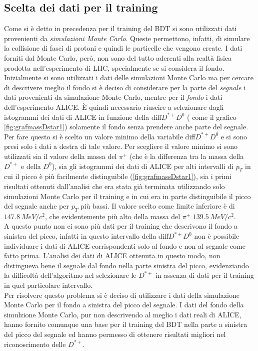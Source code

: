 \subsection{Scelta dei dati per il training}
Come si è detto in precedenza per il training del BDT si sono utilizzati dati provenienti da \textit{simulazioni Monte Carlo}. Queste permettono, infatti, di simulare la collisione di fasci di protoni e quindi le particelle che vengono create. I dati forniti dal Monte Carlo, però, non sono del tutto aderenti alla realtà fisica prodotta nell'esperimento di LHC, specialmente se si considera il fondo. 
\\ Inizialmente si sono utilizzati i dati delle simulazioni Monte Carlo ma per cercare di descrivere meglio il fondo si è deciso di considerare per la parte del \textit{segnale} i dati provenienti da simulazione Monte Carlo, mentre per il \textit{fondo} i dati dell'esperimento ALICE. È quindi necessario riuscire a selezionare dagli istogrammi dei dati di ALICE in funzione della diff${D^{*+}D^0}$ ( come il grafico \ref{fig:grafmassDstar1}) solamente il fondo senza prendere anche parte del segnale. Per fare questo si è scelto un valore minimo della variabile diff${D^{*+}D^0}$ e si sono presi solo i dati a destra di tale valore. Per scegliere il valore minimo si sono utilizzati sia il valore della massa del $\pi^+$ (che è la differenza tra la massa della $D^{*+}$ e della $D^0$), sia gli istogrammi dei dati di ALICE per alti intervalli di $p_T$ in cui il picco è più facilmente distinguibile (\ref{fig:grafmassDstar1}), sia i primi risultati ottenuti dall'analisi che era stata già terminata utilizzando solo simulazioni Monte Carlo per il training e in cui era in parte distinguibile il picco del segnale anche per $p_T$ più bassi. Il valore scelto come limite inferiore è di $147.8 \ MeV/c^2$, che evidentemente più alto della massa del $\pi^+$ $139.5 \ MeV/c^2$.
\\A questo punto non ci sono più dati per il training che descrivono il fondo a sinistra del picco, infatti in questo intervallo della diff${D^{*+}D^0}$ non è possibile individuare i dati di ALICE corrispondenti solo al fondo e non al segnale come fatto prima. L'analisi dei dati di ALICE  ottenuta in questo modo, non distingueva bene il segnale dal fondo nella parte sinistra del picco, evidenziando la difficoltà dell'algoritmo nel selezionare le $D^{*+}$ in assenza di dati per il training in quel particolare intervallo. 
\\Per risolvere questo problema si è deciso di utilizzare i dati della simulazione Monte Carlo per il fondo a sinistra del picco del segnale. I dati del fondo della simulzione Monte Carlo, pur non descrivendo al meglio i dati reali di ALICE, hanno fornito comunque una base per il training del BDT nella parte a sinistra del picco del segnale ed hanno permesso di ottenere risultati migliori nel riconoscimento delle $D^{*+}$. 
